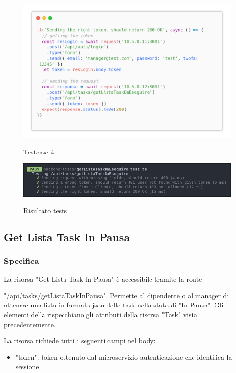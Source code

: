 \documentclass{report}
\begin{document}
\begin{figure}[H]
	\centering\includegraphics[width=1\textwidth]{images/code_da_eseguire_test4.png}
	
	Testcase 4
\end{figure}

\begin{figure}[H]
	\centering\includegraphics[width=1\textwidth]{images/jest_da_eseguire.png}
	
	Risultato tests
\end{figure}

\subsection{Get Lista Task In Pausa}
\subsubsection*{Specifica}


La risorsa "Get Lista Task In Pausa" è accessibile tramite la route

"/api/tasks/getListaTaskInPausa". Permette al dipendente o al manager di ottenere una lista in formato json delle task nello stato di "In Pausa". Gli elementi della rispecchiano gli attributi della risorsa "Task" vista precedentemente.

La risorsa richiede tutti i seguenti campi nel body:
\begin{itemize}
	\item "token": token ottenuto dal microservizio autenticazione che identifica la sessione
\end{itemize}
\end{document}
